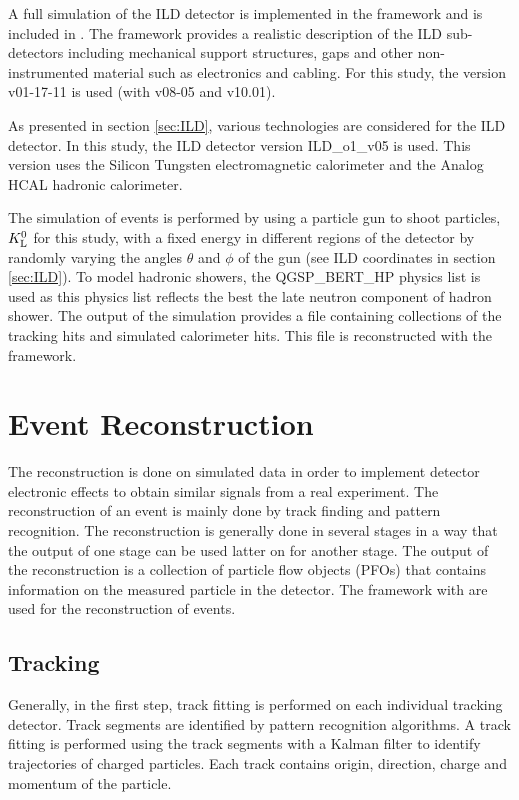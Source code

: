 A full \geant simulation of the ILD detector is implemented in the \mokka framework and is included in \ilcsoft. The \mokka framework provides a realistic description of the ILD sub-detectors including mechanical support structures, gaps and other non-instrumented material such as electronics and cabling. For this study, the \ilcsoft version v01-17-11 is used (with \mokka v08-05 and \geant v10.01).

As presented in section \ref{sec:ILD}, various technologies are considered for the ILD detector. In this study, the ILD detector version ILD\_o1\_v05 is used. This version uses the Silicon Tungsten electromagnetic calorimeter and the Analog HCAL hadronic calorimeter.

The simulation of events is performed by using a particle gun to shoot particles, $K^0_{\mathrm{L}}$ for this study, with a fixed energy in different regions of the detector by randomly varying the angles $\theta$ and $\phi$ of the gun (see ILD coordinates in section \ref{sec:ILD}). To model hadronic showers, the QGSP\_BERT\_HP physics list is used as this physics list reflects the best the late neutron component of hadron shower. The output of the simulation provides a \lcio file containing collections of the tracking hits and simulated calorimeter hits. This file is reconstructed with the \marlin framework.

\section{Event Reconstruction}
\label{sec:recochain}

The reconstruction is done on simulated data in order to implement detector electronic effects to obtain similar signals from a real experiment. The reconstruction of an event is mainly done by track finding and pattern recognition. The reconstruction is generally done in several stages in a way that the output of one stage can be used latter on for another stage. The output of the reconstruction is a collection of particle flow objects (PFOs) that contains information on the measured particle in the detector. The \ilcsoft framework with \marlin are used for the reconstruction of events.

\subsection{Tracking}

Generally, in the first step, track fitting is performed on each individual tracking detector. Track segments are identified by pattern recognition algorithms. A track fitting is performed using the track segments with a Kalman filter \cite{Li2013, Fruhwirth:1987fm} to identify trajectories of charged particles. Each track contains origin, direction, charge and momentum of the particle.

